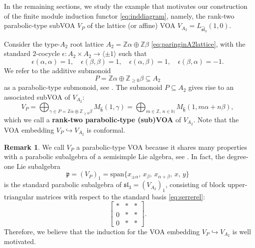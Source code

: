 \documentclass[12pt,a4paper,reqno]{amsart}
\numberwithin{equation}{section}
\numberwithin{equation}{section}
\theoremstyle{definition}
\newtheorem{remark}[thm]{Remark}
\def \ra {\rightarrow}
\def \al{\alpha}
\def \b {\beta}
\def \op {\oplus}
\def\ep{\epsilon}
\def\<{\langle}
\def\>{\rangle}
\begin{document}
	
	In the remaining sections, we study the example that motivates our construction of the finite module induction functor \eqref{eq:inddiagram}, namely, the rank-two parabolic-type subVOA $V_P$ \cite{Liu24} of the lattice (or affine) VOA $V_{A_2}=L_{\widehat{\mathfrak{sl}}_3}(1,0)$.
	
	Consider the type-$A_2$ root lattice $A_2=\mathbb{Z}\alpha\oplus\mathbb{Z}\beta$ \eqref{eq:paringinA2lattice}, with the standard $2$-cocycle $\ep:A_2\times A_2\ra \<\pm 1\>$ such that 
	\begin{equation}\label{eq:twococycle}
		\ep(\al,\al)=1,\quad \ep(\b,\b)=1,\quad \ep(\al,\b)=1,\quad \ep(\b,\al)=-1. 
	\end{equation}
	We refer to the additive submonoid 
	\[
	P=\mathbb{Z}\alpha\oplus\mathbb{Z}_{\geq 0}\beta \subseteq A_2
	\]
	as a parabolic-type submonoid, see \cite[Definition 2.1]{Liu24}. The submonoid $P\subseteq A_2$ gives rise to an associated subVOA of $V_{A_2}$:
	\begin{equation}\label{eq:defofVP}
		V_P=\bigoplus_{\gamma\in P=\mathbb{Z}\alpha\oplus\mathbb{Z}_{\geq 0}\beta} M_{\hat{\mathfrak{h}}}(1,\gamma)
		=\bigoplus_{m\in\mathbb{Z},\, n\in\mathbb{N}} M_{\hat{\mathfrak{h}}}(1,m\alpha+n\beta),
	\end{equation}
	which we call a {\bf rank-two parabolic-type (sub)VOA} of $V_{A_2}$. Note that the VOA embedding $V_P\hookrightarrow V_{A_2}$ is conformal.
	
	\begin{remark}
		We call $V_P$ a parabolic-type VOA because it shares many properties with a parabolic subalgebra of a semisimple Lie algebra, see \cite[Section~4]{Liu24}. In fact, the degree-one Lie subalgebra 
		\[
		\mathfrak{p}=(V_P)_1=\mathrm{span}\{x_{\pm\alpha},\, x_{\beta},\, x_{\alpha+\beta},\, x,\, y\}
		\]
		is the standard parabolic subalgebra of $\mathfrak{sl}_3=(V_{A_2})_1$, consisting of block upper-triangular matrices with respect to the standard basis \eqref{eq:serrerel}:
		\[
		\begin{bmatrix}
			\ast & \ast & \ast \\
			0 & \ast & \ast\\
			0 & \ast & \ast
		\end{bmatrix}.
		\]
		Therefore, we believe that the induction for the VOA embedding $V_P\hookrightarrow V_{A_2}$ is well motivated.
	\end{remark}
	
	
	
\end{document}
